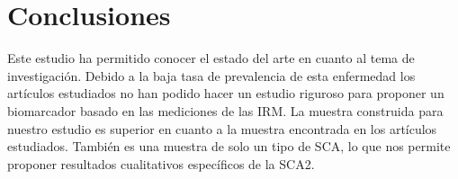 \documentclass[a4paper,12pt]{article}
\begin{document}
\section{Conclusiones}

Este estudio ha permitido conocer el estado del arte en cuanto al tema de investigación. Debido a la baja tasa de prevalencia de esta enfermedad los artículos estudiados no han podido hacer un estudio riguroso para proponer un biomarcador basado en las mediciones de las IRM. La muestra construida para nuestro estudio es superior en cuanto a la muestra encontrada en los artículos estudiados. También es una muestra de solo un tipo de SCA, lo que nos permite proponer resultados cualitativos específicos de la SCA2.           




  

 
\end{document}
